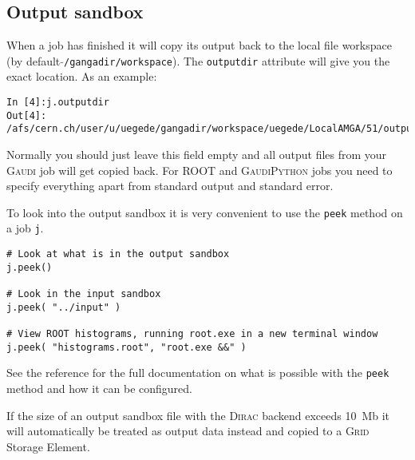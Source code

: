 \documentclass{howto}
\def\root {\textsc{ROOT}\xspace}
\def\gaudi {\textsc{Gaudi}\xspace}
\def\gaudipython {\textsc{GaudiPython}\xspace}
\def\dirac {\textsc{Dirac}\xspace}
\def\grid {\textsc{Grid}\xspace}
\begin{document}
\subsection{Output sandbox}
\label{sec:OutputSandbox}
When a job has finished it will copy its output back to the local file
workspace (by default \texttt{$\tilde{}$/gangadir/workspace}). The
\texttt{outputdir} attribute will give you the exact location. As an example:
\begin{verbatim}
In [4]:j.outputdir
Out[4]: /afs/cern.ch/user/u/uegede/gangadir/workspace/uegede/LocalAMGA/51/output
\end{verbatim}

Normally you should just leave this field empty and all output files from your
\gaudi job will get copied back. For \root and \gaudipython jobs you need to
specify everything apart from standard output and standard error.

To look into the output sandbox it is very convenient to use the \texttt{peek}
method on a job \texttt{j}.
\begin{verbatim}
# Look at what is in the output sandbox
j.peek()

# Look in the input sandbox
j.peek( "../input" )

# View ROOT histograms, running root.exe in a new terminal window
j.peek( "histograms.root", "root.exe &&" )
\end{verbatim}

See the reference for the full documentation on what is possible with the
\texttt{peek} method and how it can be configured.

If the size of an output sandbox file with the \dirac backend exceeds 10~Mb it
will automatically be treated as output data instead and copied to a \grid
Storage Element.
\end{document}
